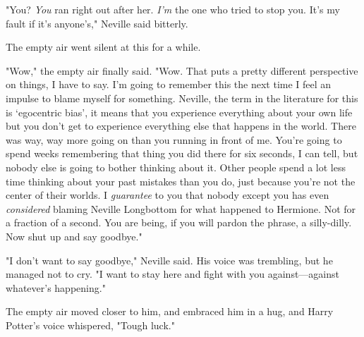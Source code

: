 "You? \emph{You} ran right out after her. \emph{I'm} the one who tried to stop
you. It's my fault if it's anyone's," Neville said bitterly.

The empty air went silent at this for a while.

"Wow," the empty air finally said. "Wow. That puts a pretty different
perspective on things, I have to say. I'm going to remember this the next time
I feel an impulse to blame myself for something. Neville, the term in the
literature for this is `egocentric bias', it means that you experience
everything about your own life but you don't get to experience everything else
that happens in the world. There was way, way more going on than you running in
front of me. You're going to spend weeks remembering that thing you did there
for six seconds, I can tell, but nobody else is going to bother thinking about
it. Other people spend a lot less time thinking about your past mistakes than
you do, just because you're not the center of their worlds. I \emph{guarantee}
to you that nobody except you has even \emph{considered} blaming Neville
Longbottom for what happened to Hermione. Not for a fraction of a second. You
are being, if you will pardon the phrase, a silly-dilly. Now shut up and say
goodbye."

"I don't want to say goodbye," Neville said. His voice was trembling, but he
managed not to cry. "I want to stay here and fight with you against---against
whatever's happening."

The empty air moved closer to him, and embraced him in a hug, and Harry
Potter's voice whispered, "Tough luck."
